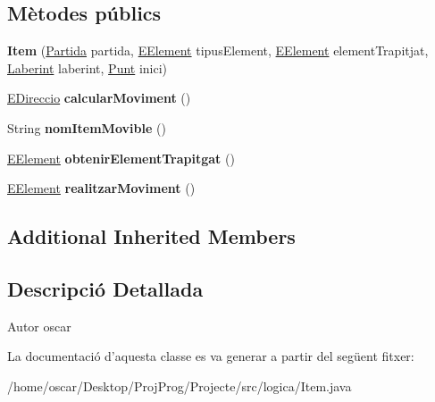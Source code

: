 \subsection*{Mètodes públics}
\begin{DoxyCompactItemize}
\item 
\hypertarget{classlogica_1_1_item_ac19a70f15ff1f377848f1df34a6e1137}{{\bfseries Item} (\hyperlink{classlogica_1_1_partida}{Partida} partida, \hyperlink{enumlogica_1_1enumeracions_1_1_e_element}{E\+Element} tipus\+Element, \hyperlink{enumlogica_1_1enumeracions_1_1_e_element}{E\+Element} element\+Trapitjat, \hyperlink{classlogica_1_1laberints_1_1_laberint}{Laberint} laberint, \hyperlink{classlogica_1_1_punt}{Punt} inici)}\label{classlogica_1_1_item_ac19a70f15ff1f377848f1df34a6e1137}

\item 
\hypertarget{classlogica_1_1_item_a0b85057e526c921f66a586e334b94685}{\hyperlink{enumlogica_1_1enumeracions_1_1_e_direccio}{E\+Direccio} {\bfseries calcular\+Moviment} ()}\label{classlogica_1_1_item_a0b85057e526c921f66a586e334b94685}

\item 
\hypertarget{classlogica_1_1_item_a729ac980199af2b84c3dc6ef14b57e43}{String {\bfseries nom\+Item\+Movible} ()}\label{classlogica_1_1_item_a729ac980199af2b84c3dc6ef14b57e43}

\item 
\hypertarget{classlogica_1_1_item_a81cb8508f21f320f54ca5d279fa24625}{\hyperlink{enumlogica_1_1enumeracions_1_1_e_element}{E\+Element} {\bfseries obtenir\+Element\+Trapitgat} ()}\label{classlogica_1_1_item_a81cb8508f21f320f54ca5d279fa24625}

\item 
\hypertarget{classlogica_1_1_item_a9990d70a8ad35319d2bb9d10b294b17a}{\hyperlink{enumlogica_1_1enumeracions_1_1_e_element}{E\+Element} {\bfseries realitzar\+Moviment} ()}\label{classlogica_1_1_item_a9990d70a8ad35319d2bb9d10b294b17a}

\end{DoxyCompactItemize}
\subsection*{Additional Inherited Members}


\subsection{Descripció Detallada}
\begin{DoxyAuthor}{Autor}
oscar 
\end{DoxyAuthor}


La documentació d'aquesta classe es va generar a partir del següent fitxer\+:\begin{DoxyCompactItemize}
\item 
/home/oscar/\+Desktop/\+Proj\+Prog/\+Projecte/src/logica/Item.\+java\end{DoxyCompactItemize}
